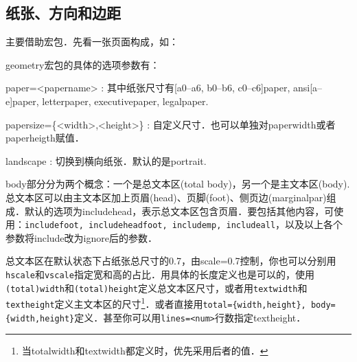
\subsection{纸张、方向和边距}
主要借助宏包．先看一张页面构成，如：
\begin{figure}
\centering

\label{fig:geo-paper}
\end{figure}

geometry宏包的具体的选项参数有：
\begin{para}
\item[paper=<papername>]: 其中纸张尺寸有[a0--a6, b0--b6, c0--c6]paper, ansi[a--e]paper, letterpaper, executivepaper, legalpaper.
\item[papersize=\{<width>,<height>\}]: 自定义尺寸．也可以单独对paperwidth或者paperheigth赋值．
\item[landscape]: 切换到横向纸张．默认的是portrait.
\end{para}

body部分分为两个概念：一个是总文本区(total body)，另一个是主文本区(body). 总文本区可以由主文本区加上页眉(head)、页脚(foot)、侧页边(marginalpar)组成．默认的选项为includehead，表示总文本区包含页眉．要包括其他内容，可使用：\texttt{includefoot, includeheadfoot, includemp, includeall}，以及以上各个参数将include改为ignore后的参数．

总文本区在默认状态下占纸张总尺寸的0.7，由scale=0.7控制，你也可以分别用\texttt{hscale}和\texttt{vscale}指定宽和高的占比．用具体的长度定义也是可以的，使用\texttt{(total)width}和\texttt{(total)height}定义总文本区尺寸，或者用\texttt{textwidth}和\texttt{textheight}定义主文本区的尺寸\footnote{当totalwidth和textwidth都定义时，优先采用后者的值．}．或者直接用\texttt{total=\{width,height\}, body=\{width,height\}}定义．甚至你可以用\texttt{lines=<num>}行数指定textheight．

